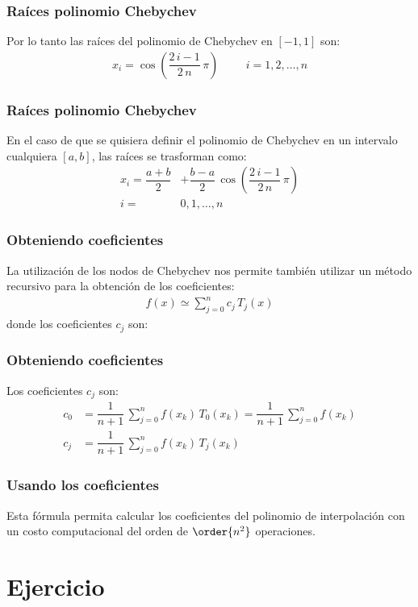 \begin{frame}
\frametitle{Raíces polinomio Chebychev}
Por lo tanto las raíces del polinomio de Chebychev en $[-1,1]$ son:
\begin{align*}
x_{i} = \cos \left( \dfrac{2 \, i - 1}{2 \, n} \, \pi \right) \hspace{1cm} i = 1, 2, \ldots, n
\end{align*}
\end{frame}
\begin{frame}
\frametitle{Raíces polinomio Chebychev}
En el caso de que se quisiera definir el polinomio de Chebychev en un intervalo cualquiera $[a, b]$, las raíces se trasforman como:
\begin{align*}
x_{i} = \dfrac{a + b}{2} &+ \dfrac{b - a}{2} \, \cos \left( \dfrac{2 \, i - 1}{2 \, n} \, \pi \right) \\[0.5em] 
i =& 0, 1, \ldots, n
\end{align*}
\end{frame}
\begin{frame}
\frametitle{Obteniendo coeficientes}
La utilización de los nodos de Chebychev nos permite también utilizar un método recursivo para la obtención de los coeficientes:
\begin{align*}
f(x) \simeq \sum_{j=0}^{n} c_{j} \, T_{j}(x)
\end{align*}
donde los coeficientes $c_{j}$ son:
\end{frame}
\begin{frame}
\frametitle{Obteniendo coeficientes}
Los coeficientes $c_{j}$ son:
\begin{align*}
c_{0} &= \dfrac{1}{n + 1} \, \sum_{j=0}^{n} f(x_{k}) \, T_{0}(x_{k}) = \dfrac{1}{n + 1} \, \sum_{j=0}^{n} f(x_{k}) \\[0.5em]
c_{j} &= \dfrac{1}{n + 1} \, \sum_{j=0}^{n} f(x_{k}) \, T_{j}(x_{k})
\end{align*}
\end{frame}
\begin{frame}
\frametitle{Usando los coeficientes}
Esta fórmula permita calcular los coeficientes del polinomio de interpolación con un costo computacional del orden de $\order{n^{2}}$ operaciones.
\end{frame}
\section{Ejercicio}
